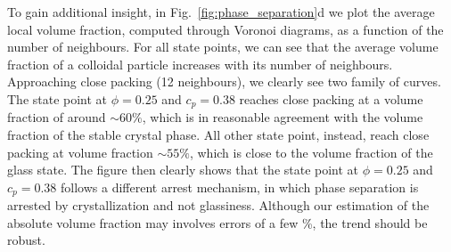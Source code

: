 \documentclass[twocolumn,showpacs,amsmath,amssymb,pre,superscriptaddress]{revtex4}
\begin{document}
To gain additional insight, in Fig.~\ref{fig:phase_separation}d we plot the average local volume fraction, computed
through Voronoi diagrams, as a function of the number of neighbours. For all state points, we can see that the average volume fraction of a colloidal
particle increases with its number of neighbours. Approaching close packing (12 neighbours), we clearly see two family of curves. The state point
at $\phi=0.25$ and $c_p=0.38$ reaches close packing at a volume fraction of around $\sim 60\%$, which is in reasonable agreement with the
volume fraction of the stable crystal phase. All other state point, instead, reach close packing at volume fraction $\sim 55\%$, which is
close to the volume fraction of the glass state. 
The figure then clearly shows that the state point at $\phi=0.25$ and $c_p=0.38$ follows a different arrest mechanism, in which phase separation
is arrested by crystallization and not glassiness. Although our estimation of the absolute volume fraction may involves errors of a few \%, the trend should be robust.


% 

% 
% 
\end{document}
